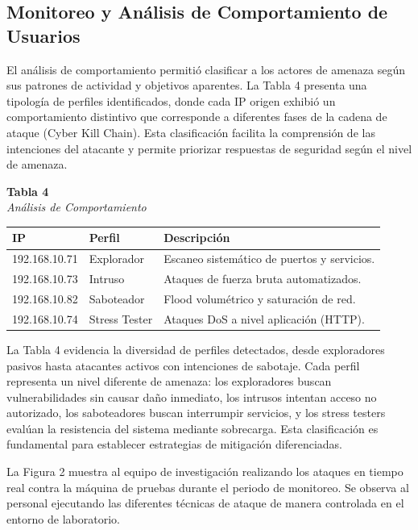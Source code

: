 \subsection{Monitoreo y An\'alisis de Comportamiento de Usuarios}

El an\'alisis de comportamiento permiti\'o clasificar a los actores de amenaza seg\'un sus patrones de actividad y objetivos aparentes. La Tabla 4 presenta una tipolog\'ia de perfiles identificados, donde cada IP origen exhibi\'o un comportamiento distintivo que corresponde a diferentes fases de la cadena de ataque (Cyber Kill Chain). Esta clasificaci\'on facilita la comprensi\'on de las intenciones del atacante y permite priorizar respuestas de seguridad seg\'un el nivel de amenaza.

\begin{table}[htbp]
\centering
{\fontsize{8}{10}\selectfont
\textbf{Tabla 4}\\[2pt]
\textit{An\'{a}lisis de Comportamiento}
}
\vspace{2mm}
\label{tab:monitoreo_usuarios}
{\fontsize{6.5}{8}\selectfont
\setlength{\tabcolsep}{2pt}
\begin{tabular}{@{}p{1.8cm}p{1.5cm}p{4.2cm}@{}}
\hline
IP & Perfil & Descripci\'{o}n \\\hline
192.168.10.71 & Explorador & Escaneo sistemático de puertos y servicios. \\
192.168.10.73 & Intruso & Ataques de fuerza bruta automatizados. \\
192.168.10.82 & Saboteador & Flood volumétrico y saturación de red. \\
192.168.10.74 & Stress Tester & Ataques DoS a nivel aplicación (HTTP). \\
\hline
\end{tabular}}
\end{table}

La Tabla 4 evidencia la diversidad de perfiles detectados, desde exploradores pasivos hasta atacantes activos con intenciones de sabotaje. Cada perfil representa un nivel diferente de amenaza: los exploradores buscan vulnerabilidades sin causar da\~no inmediato, los intrusos intentan acceso no autorizado, los saboteadores buscan interrumpir servicios, y los stress testers eval\'uan la resistencia del sistema mediante sobrecarga. Esta clasificaci\'on es fundamental para establecer estrategias de mitigaci\'on diferenciadas.

La Figura 2 muestra al equipo de investigaci\'on realizando los ataques en tiempo real contra la m\'aquina de pruebas durante el periodo de monitoreo. Se observa al personal ejecutando las diferentes t\'ecnicas de ataque de manera controlada en el entorno de laboratorio.

